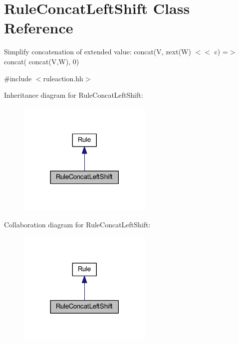 \hypertarget{class_rule_concat_left_shift}{}\section{Rule\+Concat\+Left\+Shift Class Reference}
\label{class_rule_concat_left_shift}


Simplify concatenation of extended value\+: {\ttfamily concat(V, zext(\+W) $<$$<$ c) =$>$ concat( concat(\+V,\+W), 0)}  




{\ttfamily \#include $<$ruleaction.\+hh$>$}



Inheritance diagram for Rule\+Concat\+Left\+Shift\+:
\nopagebreak
\begin{figure}[H]
\begin{center}
\leavevmode
\includegraphics[width=182pt]{class_rule_concat_left_shift__inherit__graph}
\end{center}
\end{figure}


Collaboration diagram for Rule\+Concat\+Left\+Shift\+:
\nopagebreak
\begin{figure}[H]
\begin{center}
\leavevmode
\includegraphics[width=182pt]{class_rule_concat_left_shift__coll__graph}
\end{center}
\end{figure}
